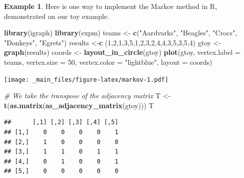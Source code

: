 \documentclass[
]{book}
\newenvironment{Shaded}{\begin{snugshade}}{\end{snugshade}}
\newcommand{\AttributeTok}[1]{\textcolor[rgb]{0.13,0.29,0.53}{#1}}
\newcommand{\CommentTok}[1]{\textcolor[rgb]{0.56,0.35,0.01}{\textit{#1}}}
\newcommand{\DecValTok}[1]{\textcolor[rgb]{0.00,0.00,0.81}{#1}}
\newcommand{\FunctionTok}[1]{\textcolor[rgb]{0.13,0.29,0.53}{\textbf{#1}}}
\newcommand{\NormalTok}[1]{#1}
\newcommand{\OtherTok}[1]{\textcolor[rgb]{0.56,0.35,0.01}{#1}}
\newcommand{\StringTok}[1]{\textcolor[rgb]{0.31,0.60,0.02}{#1}}
\theoremstyle{definition}
\theoremstyle{definition}
\newtheorem{example}{Example}[chapter]
\theoremstyle{definition}
\theoremstyle{definition}
\theoremstyle{remark}
\begin{document}
\begin{examplebox}

\begin{example}

Here is one way to implement the Markov method in R, demonstrated on our toy example.

\begin{Shaded}
\begin{Highlighting}[]
\FunctionTok{library}\NormalTok{(igraph)}
\FunctionTok{library}\NormalTok{(expm)}
\NormalTok{teams }\OtherTok{\textless{}{-}} \FunctionTok{c}\NormalTok{(}\StringTok{"Aardvarks"}\NormalTok{, }\StringTok{"Beagles"}\NormalTok{, }\StringTok{"Crocs"}\NormalTok{,  }
          \StringTok{"Donkeys"}\NormalTok{, }\StringTok{"Egrets"}\NormalTok{)}
\NormalTok{results }\OtherTok{\textless{}{-}}\FunctionTok{c}\NormalTok{ (}\DecValTok{1}\NormalTok{,}\DecValTok{2}\NormalTok{,}\DecValTok{1}\NormalTok{,}\DecValTok{3}\NormalTok{,}\DecValTok{5}\NormalTok{,}\DecValTok{1}\NormalTok{,}\DecValTok{2}\NormalTok{,}\DecValTok{3}\NormalTok{,}\DecValTok{2}\NormalTok{,}\DecValTok{4}\NormalTok{,}\DecValTok{4}\NormalTok{,}\DecValTok{3}\NormalTok{,}\DecValTok{5}\NormalTok{,}\DecValTok{3}\NormalTok{,}\DecValTok{5}\NormalTok{,}\DecValTok{4}\NormalTok{)}
\NormalTok{gtoy }\OtherTok{\textless{}{-}} \FunctionTok{graph}\NormalTok{(results)}
\NormalTok{coords }\OtherTok{\textless{}{-}} \FunctionTok{layout\_in\_circle}\NormalTok{(gtoy)}
\FunctionTok{plot}\NormalTok{(gtoy, }\AttributeTok{vertex.label =}\NormalTok{ teams, }\AttributeTok{vertex.size =} \DecValTok{50}\NormalTok{,  }
     \AttributeTok{vertex.color =} \StringTok{"lightblue"}\NormalTok{, }\AttributeTok{layout =}\NormalTok{ coords)}
\end{Highlighting}
\end{Shaded}

\texttt{[image: \_main\_files/figure-latex/markov-1.pdf]}

\begin{Shaded}
\begin{Highlighting}[]
\CommentTok{\# We take the transpose of the adjacency matrix}
\NormalTok{T }\OtherTok{\textless{}{-}} \FunctionTok{t}\NormalTok{(}\FunctionTok{as.matrix}\NormalTok{(}\FunctionTok{as\_adjacency\_matrix}\NormalTok{(gtoy))) }
\NormalTok{T}
\end{Highlighting}
\end{Shaded}

\begin{verbatim}
##      [,1] [,2] [,3] [,4] [,5]
## [1,]    0    0    0    0    1
## [2,]    1    0    0    0    0
## [3,]    1    1    0    1    1
## [4,]    0    1    0    0    1
## [5,]    0    0    0    0    0
\end{verbatim}


\end{example}
\end{examplebox}
\end{document}
